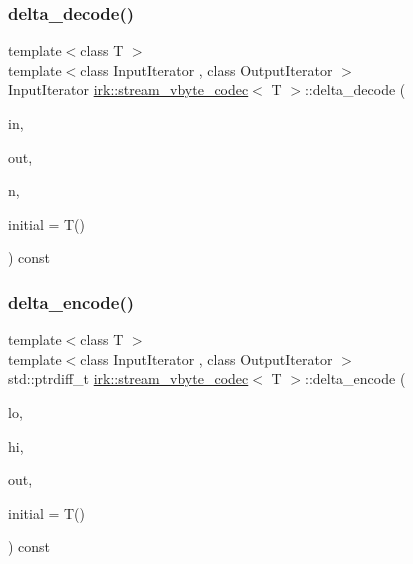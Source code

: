 \subsubsection{\texorpdfstring{delta\+\_\+decode()}{delta\_decode()}}
{\footnotesize\ttfamily template$<$class T $>$ \\
template$<$class Input\+Iterator , class Output\+Iterator $>$ \\
Input\+Iterator \mbox{\hyperlink{structirk_1_1stream__vbyte__codec}{irk\+::stream\+\_\+vbyte\+\_\+codec}}$<$ T $>$\+::delta\+\_\+decode (\begin{DoxyParamCaption}\item[{Input\+Iterator}]{in,  }\item[{Output\+Iterator}]{out,  }\item[{int}]{n,  }\item[{T}]{initial = {\ttfamily T()} }\end{DoxyParamCaption}) const\hspace{0.3cm}{\ttfamily [inline]}}

\mbox{\label{structirk_1_1stream__vbyte__codec_a4282c914d2b3975aab39afc2534e7e6c}} 
\subsubsection{\texorpdfstring{delta\+\_\+encode()}{delta\_encode()}}
{\footnotesize\ttfamily template$<$class T $>$ \\
template$<$class Input\+Iterator , class Output\+Iterator $>$ \\
std\+::ptrdiff\+\_\+t \mbox{\hyperlink{structirk_1_1stream__vbyte__codec}{irk\+::stream\+\_\+vbyte\+\_\+codec}}$<$ T $>$\+::delta\+\_\+encode (\begin{DoxyParamCaption}\item[{Input\+Iterator}]{lo,  }\item[{Input\+Iterator}]{hi,  }\item[{Output\+Iterator}]{out,  }\item[{T}]{initial = {\ttfamily T()} }\end{DoxyParamCaption}) const\hspace{0.3cm}{\ttfamily [inline]}}


